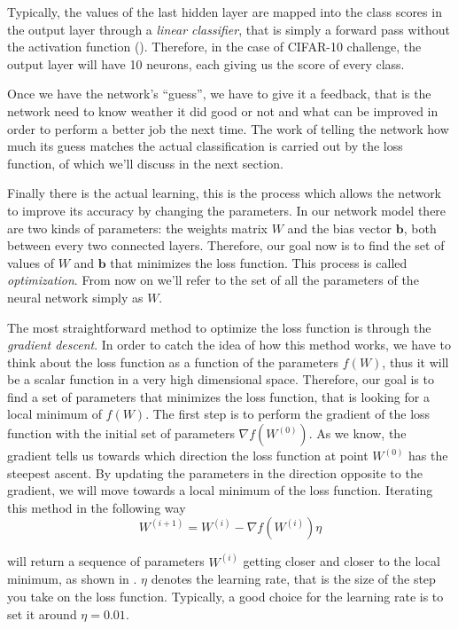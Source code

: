 \documentclass[12pt,a4paper]{report}
\theoremstyle{definition}
\begin{document}
Typically, the values of the last hidden layer are mapped into the class scores in the output layer through a \emph{linear classifier}, that is simply a   forward pass without the activation function (). Therefore, in the case of CIFAR-10 challenge, the output layer will have 10 neurons, each giving us the score of every class.

Once we have the network's ``guess'', we have to give it a feedback, that is the network need to know weather it did good or not and what can be improved in order to perform a better job the next time. The work of telling the network how much its guess matches the actual classification is carried out by the loss function, of which we'll discuss in the next section.

Finally there is the actual learning, this is the process which allows the network to improve its accuracy by changing the parameters. In our network model there are two kinds of parameters: the weights matrix $W$ and the bias vector $\textbf{b}$, both between every two connected layers. Therefore, our goal now is to find the set of values of $W$ and $\textbf{b}$ that minimizes the loss function. This process is called \emph{optimization}. From now on we'll refer to the set of all the parameters of the neural network simply as $W$.

The most straightforward method to optimize the loss function is through the \emph{gradient descent}.
In order to catch the idea of how this method works, we have to think about the loss function as a function of the parameters $f \left( W \right)$, thus it will be a scalar function in a very high dimensional space.
Therefore, our goal is to find a set of parameters that minimizes the loss function, that is looking for a local minimum of $f(W)$.
The first step is to perform the gradient of the loss function with the initial set of parameters $\nabla f\left( W^{(0)} \right)$.
As we know, the gradient tells us towards which direction the loss function at point $W^{(0)}$ has the steepest ascent.
By updating the parameters in the direction opposite to the gradient, we will move towards a local minimum of the loss function.
Iterating this method in the following way
\begin{equation}
    W^{(i+1)} = W^{(i)} - \nabla f \left( W^{(i)} \right) \eta
    \label{eq:gradient_descent}
\end{equation}

will return a sequence of parameters $W^{(i)}$ getting closer and closer to the local minimum, as shown in .
$\eta$ denotes the learning rate, that is the size of the step you take on the loss function.
Typically, a good choice for the learning rate is to set it around $\eta = 0.01$.
\end{document}
